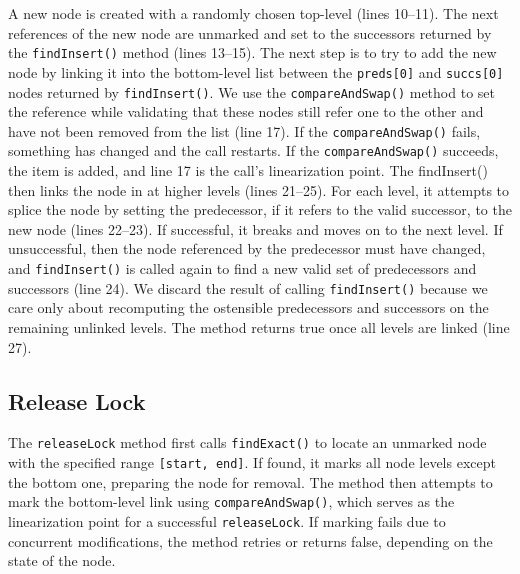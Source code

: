 A new node is created with a randomly chosen top-level (lines 10--11). 
The next references of the new node are unmarked and set to the successors returned by the \texttt{findInsert()} method (lines 13--15).
The next step is to try to add the new node by linking it into the bottom-level list between the \texttt{preds[0]} and \texttt{succs[0]} nodes returned by \texttt{findInsert()}. 
We use the \texttt{compareAndSwap()} method to set the reference while validating that these nodes still refer one to the other and have not been removed from the list (line 17). 
If the  \texttt{compareAndSwap()} fails, something has changed and the call restarts. 
If the  \texttt{compareAndSwap()} succeeds, the item is added, and line 17 is the call's linearization point.
The {findInsert()} then links the node in at higher levels (lines 21--25). 
For each level, it attempts to splice the node by setting the predecessor, if it refers to the valid successor, to the new node (lines 22--23). If successful, it breaks and moves on to the next level. 
If unsuccessful, then the node referenced by the predecessor must have changed, and \texttt{findInsert()} is called again to find a new valid set of predecessors and successors (line 24). 
We discard the result of calling \texttt{findInsert()} because we care only about recomputing the ostensible predecessors and successors on the remaining unlinked levels. 
The method returns true once all levels are linked (line 27).

\subsection{Release Lock}\label{subsec:releaseLock}

The \texttt{releaseLock} method first calls \texttt{findExact()} to locate an unmarked node with the specified range \texttt{[start, end]}. 
If found, it marks all node levels except the bottom one, preparing the node for removal. 
The method then attempts to mark the bottom-level link using \texttt{compareAndSwap()}, which serves as the linearization point for a successful \texttt{releaseLock}. 
If marking fails due to concurrent modifications, the method retries or returns false, depending on the state of the node.

\vspace{15pt}
\begin{figure}[h!]
    \centering
    
\end{figure}

